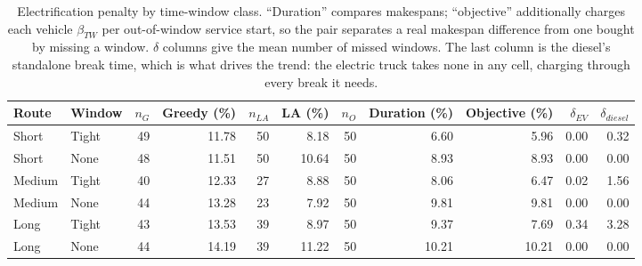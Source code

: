 \begin{table}[ht]\centering
\caption{Electrification penalty by time-window class.  ``Duration'' compares makespans; ``objective'' additionally charges each vehicle $\beta_{TW}$ per out-of-window service start, so the pair separates a real makespan difference from one bought by missing a window.  $\delta$ columns give the mean number of missed windows.  The last column is the diesel's standalone break time, which is what drives the trend: the electric truck takes none in any cell, charging through every break it needs.}
\label{tab:diesel-tw}
\begin{tabular}{llrrrrrrrrr}
\hline
Route & Window & $n_G$ & Greedy (\%) & $n_{LA}$ & LA (\%) & $n_O$ & Duration (\%) & Objective (\%) & $\delta_{EV}$ & $\delta_{diesel}$ \\
\hline
Short & Tight & 49 & 11.78 & 50 & 8.18 & 50 & 6.60 & 5.96 & 0.00 & 0.32 \\
Short & None & 48 & 11.51 & 50 & 10.64 & 50 & 8.93 & 8.93 & 0.00 & 0.00 \\
Medium & Tight & 40 & 12.33 & 27 & 8.88 & 50 & 8.06 & 6.47 & 0.02 & 1.56 \\
Medium & None & 44 & 13.28 & 23 & 7.92 & 50 & 9.81 & 9.81 & 0.00 & 0.00 \\
Long & Tight & 43 & 13.53 & 39 & 8.97 & 50 & 9.37 & 7.69 & 0.34 & 3.28 \\
Long & None & 44 & 14.19 & 39 & 11.22 & 50 & 10.21 & 10.21 & 0.00 & 0.00 \\
\hline
\end{tabular}
\end{table}
